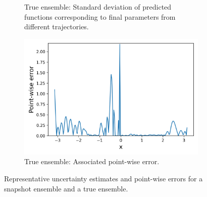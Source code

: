\begin{figure}[H]
\begin{subfigure}[b]{.45\textwidth}
		\caption{True ensemble: Standard deviation of predicted functions corresponding to final parameters from different trajectories.}
	\end{subfigure}
	\hspace{1cm}
	\begin{subfigure}[b]{.45\textwidth}
		\centering
		\includegraphics[width=1\linewidth]{./figs/ens_rep_err.png}  
		\caption{True ensemble: Associated point-wise error. \newline}
	\end{subfigure}
	\caption{Representative uncertainty estimates and point-wise errors for a snapshot ensemble and a true ensemble.}
\end{figure}

